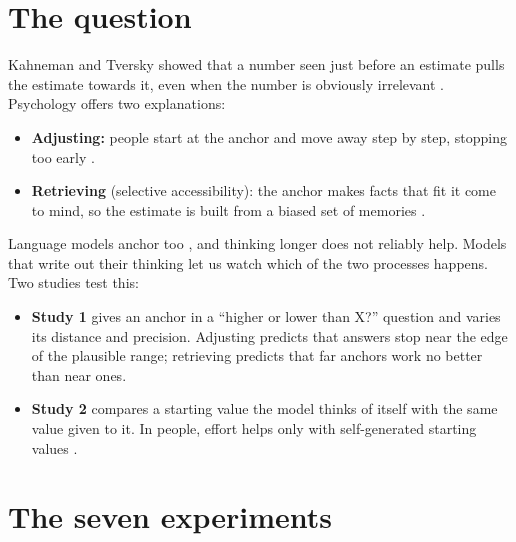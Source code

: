 \documentclass[11pt,a4paper]{article}
\begin{document}
\section{The question}
Kahneman and Tversky showed that a number seen just before an estimate pulls the estimate towards it, even when the number is obviously irrelevant \citep{tversky1974judgment}. Psychology offers two explanations:
\begin{itemize}[leftmargin=*]
  \item \textbf{Adjusting:} people start at the anchor and move away step by step, stopping too early \citep{epley2006anchoring}.
  \item \textbf{Retrieving} (selective accessibility): the anchor makes facts that fit it come to mind, so the estimate is built from a biased set of memories \citep{mussweiler1999hypothesis}.
\end{itemize}
Language models anchor too \citep{lou2026anchoring}, and thinking longer does not reliably help. Models that write out their thinking let us watch which of the two processes happens. Two studies test this:
\begin{itemize}[leftmargin=*]
  \item \textbf{Study 1} gives an anchor in a \enquote{higher or lower than X?} question and varies its distance and precision. Adjusting predicts that answers stop near the edge of the plausible range; retrieving predicts that far anchors work no better than near ones.
  \item \textbf{Study 2} compares a starting value the model thinks of itself with the same value given to it. In people, effort helps only with self-generated starting values \citep{epley2005effortful}.
\end{itemize}

\section{The seven experiments}
\end{document}
